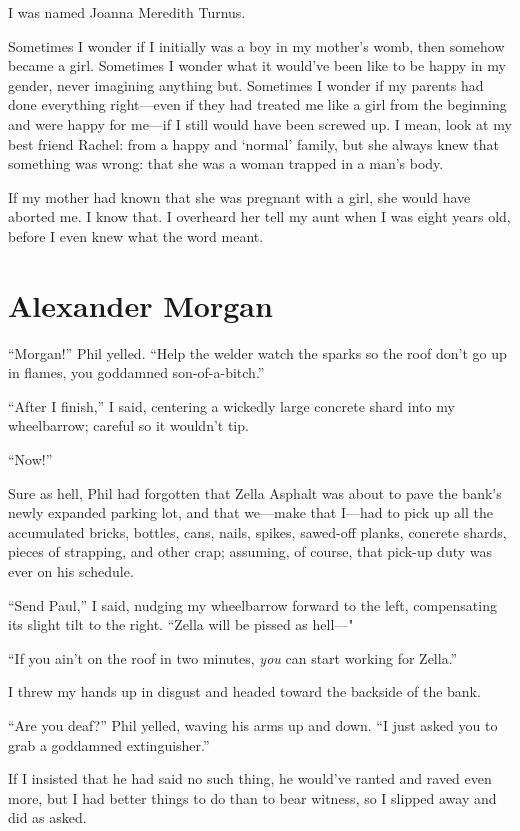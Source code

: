 I was named Joanna Meredith Turnus. ~

Sometimes I wonder if I initially was a boy in my mother's womb, then
somehow became a girl. Sometimes I wonder what it would've been like to
be happy in my gender, never imagining anything but. Sometimes I wonder
if my parents had done everything right---even if they had treated me
like a girl from the beginning and were happy for me---if I still would
have been screwed up. I mean, look at my best friend Rachel: from a
happy and `normal' family, but she always knew that something was wrong:
that she was a woman trapped in a man's body.

If my mother had known that she was pregnant with a girl, she would have
aborted me. I know that. I overheard her tell my aunt when I was eight
years old, before I even knew what the word meant.

\chapter{Alexander Morgan}

\titlemark

``Morgan!'' Phil yelled. ``Help the welder watch the sparks so the roof
don't go up in flames, you goddamned son-of-a-bitch.''

``After I finish,'' I said, centering a wickedly large concrete shard
into my wheelbarrow; careful so it wouldn't tip.

``Now!''

Sure as hell, Phil had forgotten that Zella Asphalt was about to pave
the bank's newly expanded parking lot, and that we---make that I---had
to pick up all the accumulated bricks, bottles, cans, nails, spikes,
sawed-off planks, concrete shards, pieces of strapping, and other crap;
assuming, of course, that pick-up duty was ever on his schedule.

``Send Paul,'' I said, nudging my wheelbarrow forward to the left,
compensating its slight tilt to the right. ``Zella will be pissed as
hell---"

``If you ain't on the roof in two minutes, \emph{you} can start working
for Zella.''

I threw my hands up in disgust and headed toward the backside of the
bank.

``Are you deaf?'' Phil yelled, waving his arms up and down. ``I just
asked you to grab a goddamned extinguisher.''

If I insisted that he had said no such thing, he would've ranted and
raved even more, but I had better things to do than to bear witness, so
I slipped away and did as asked.

